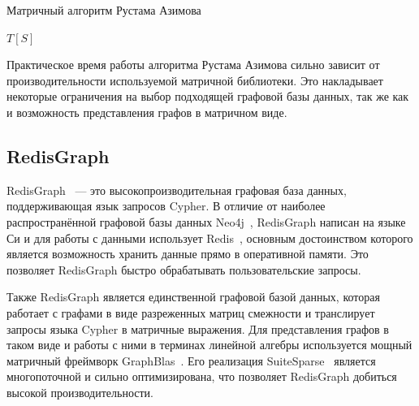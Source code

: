
\begin{algorithm}
\caption{Матричный алгоритм Рустама Азимова}

\begin{algorithmic}[1]
        \EndFor
    \EndFor    
        \EndFor
    \EndWhile
\State \Return $T[S]$
\EndFunction

\end{algorithmic}
\end{algorithm}

Практическое время работы алгоритма Рустама Азимова сильно зависит от производительности используемой матричной библиотеки. Это накладывает некоторые ограничения на выбор подходящей графовой базы данных, так же как и возможность представления графов в матричном виде.

\subsection{RedisGraph}
RedisGraph~\cite{redis-graph} --- это высокопроизводительная графовая база данных, поддерживающая язык запросов Cypher. В отличие от наиболее распространённой графовой базы данных Neo4j~\cite{neo4j}, RedisGraph написан на языке Си и для работы с данными использует Redis~\cite{redis}, основным достоинством которого является возможность хранить данные прямо в оперативной памяти. Это позволяет RedisGraph быстро обрабатывать пользовательские запросы.

Также RedisGraph является единственной графовой базой данных, которая работает с графами в виде разреженных матриц смежности и транслирует запросы языка Cypher в матричные выражения. Для представления графов в таком виде и работы с ними в терминах линейной алгебры используется мощный матричный фреймворк GraphBlas~\cite{graph-blas}. Его реализация SuiteSparse~\cite{suite-sparse} является многопоточной и сильно оптимизирована, что позволяет RedisGraph добиться высокой производительности.

